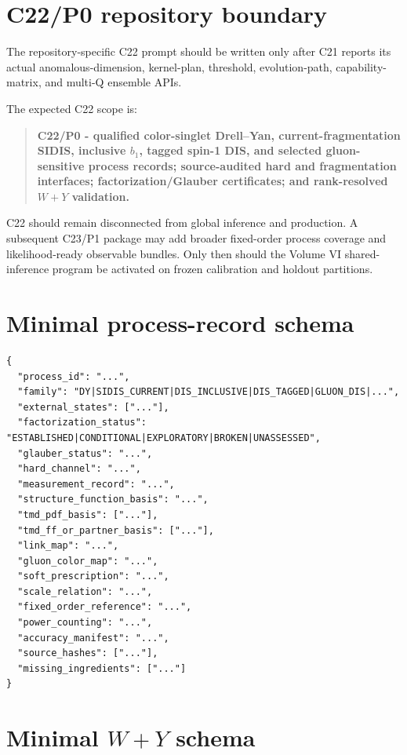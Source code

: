 \documentclass[11pt]{article}
\begin{document}
\section{C22/P0 repository boundary}
\label{sec:c22}

The repository-specific C22 prompt should be written only after C21 reports its actual anomalous-dimension, kernel-plan, threshold, evolution-path, capability-matrix, and multi-Q ensemble APIs.

The expected C22 scope is:
\begin{quote}
\textbf{C22/P0 - qualified color-singlet Drell--Yan, current-fragmentation SIDIS, inclusive \(b_1\), tagged spin-1 DIS, and selected gluon-sensitive process records; source-audited hard and fragmentation interfaces; factorization/Glauber certificates; and rank-resolved \(W+Y\) validation.}
\end{quote}

C22 should remain disconnected from global inference and production.  A subsequent C23/P1 package may add broader fixed-order process coverage and likelihood-ready observable bundles.  Only then should the Volume VI shared-inference program be activated on frozen calibration and holdout partitions.

\appendix

\section{Minimal process-record schema}
\label{app:process-schema}

\begin{verbatim}
{
  "process_id": "...",
  "family": "DY|SIDIS_CURRENT|DIS_INCLUSIVE|DIS_TAGGED|GLUON_DIS|...",
  "external_states": ["..."],
  "factorization_status": "ESTABLISHED|CONDITIONAL|EXPLORATORY|BROKEN|UNASSESSED",
  "glauber_status": "...",
  "hard_channel": "...",
  "measurement_record": "...",
  "structure_function_basis": "...",
  "tmd_pdf_basis": ["..."],
  "tmd_ff_or_partner_basis": ["..."],
  "link_map": "...",
  "gluon_color_map": "...",
  "soft_prescription": "...",
  "scale_relation": "...",
  "fixed_order_reference": "...",
  "power_counting": "...",
  "accuracy_manifest": "...",
  "source_hashes": ["..."],
  "missing_ingredients": ["..."]
}
\end{verbatim}

\section{Minimal \texorpdfstring{\(W+Y\)}{W+Y} schema}
\label{app:wy-schema}
\end{document}
